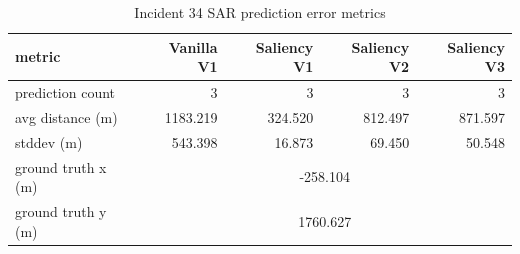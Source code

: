 \begin{table}[ht]
\centering
\caption{Incident 34 SAR prediction error metrics}
\label{tab:sar-incident-34}
\begin{tabular}{lrrrr}
\hline
metric & Vanilla V1 & Saliency V1 & Saliency V2 & Saliency V3 \\
\hline
prediction count & 3 & 3 & 3 & 3 \\
avg distance (m) & 1183.219 & 324.520 & 812.497 & 871.597 \\
stddev (m) & 543.398 & 16.873 & 69.450 & 50.548 \\
ground truth x (m) & \multicolumn{4}{c}{-258.104} \\
ground truth y (m) & \multicolumn{4}{c}{1760.627} \\
\hline
\end{tabular}
\end{table}

